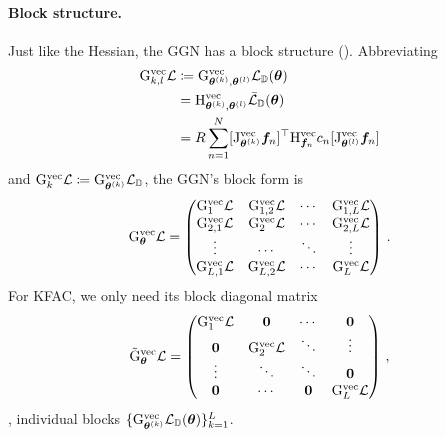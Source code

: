 \paragraph{Block structure.}
Just like the Hessian, the GGN has a block structure ().
Abbreviating
\begin{align*}
  \ggn_{k,l}^{\vec}\gL
  &\coloneq \ggn^{\vec}_{\vtheta^{(k)}, \vtheta^{(l)}} \gL_{\sD}(\vtheta)
  \\
  &= \hess^{\vec}_{\vtheta^{(k)}, \vtheta^{(l)}} \bar{\gL}_{\sD}(\vtheta)
  \\
  &= R \sum_{n=1}^N [\jac_{\vtheta^{(k)}}^{\vec} \vf_n]^{\top} \hess^{\vec}_{\vf_n} c_n [\jac_{\vtheta^{(l)}}^{\vec} \vf_n]
\end{align*}
and $\ggn_{k}^{\vec}\gL \coloneq \ggn^{\vec}_{\vtheta^{(k)}} \gL_{\sD}$, the GGN's block form is
\begin{align*}
  \ggn_{\vtheta}^{\vec} \gL
  =
  \begin{pmatrix}
    \ggn_1^{\vec} \gL
    &
      \ggn_{1, 2}^{\vec} \gL
    &
      \cdots
    &
      \ggn_{1, L}^{\vec} \gL
    \\
    \ggn_{2, 1}^{\vec} \gL
    &
      \ggn_2^{\vec} \gL
    &
      \cdots
    &
      \ggn_{2, L}^{\vec} \gL
    \\
    \vdots & \cdots & \ddots & \vdots
    \\
    \ggn_{L, 1}^{\vec} \gL
    &
      \ggn_{L, 2}^{\vec} \gL
    &
      \cdots
    &
      \ggn_L^{\vec} \gL
  \end{pmatrix}\,.
\end{align*}
For KFAC, we only need its block diagonal matrix
\begin{align*}
  \tilde{\ggn}_{\vtheta}^{\vec} \gL
  =
  \begin{pmatrix}
    \ggn_1^{\vec} \gL & \vzero & \cdots & \vzero
    \\
    \vzero & \ggn_2^{\vec} \gL & \ddots & \vdots
    \\
    \vdots & \ddots & \ddots & \vzero
    \\
    \vzero & \cdots & \vzero & \ggn_L^{\vec} \gL
  \end{pmatrix}\,,
\end{align*}
\ie, individual blocks $\{ \ggn_{\vtheta^{(k)}}^{\vec} \gL_{\sD}(\vtheta)\}_{k=1}^L$.


